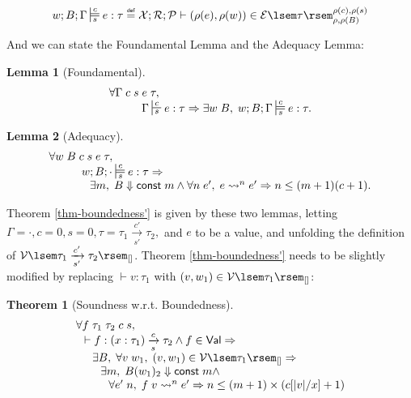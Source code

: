 \documentclass[preprint]{sigplanconf}
\newcommand{\typing}[4]{\sststile{#4}{#3}#1:#2}
\newcommand{\related}[4]{\sdtstile{#4}{#3}#1:#2}
\newcommand{\arrow}[4]{#1\xrightarrow[#3]{#2}#4}
\newcommand{\relV}[1]{\mathcal{V}\lsem#1\rsem}
\newcommand{\relE}[1]{\mathcal{E}\lsem#1\rsem}
\newcommand\defeq{\mathrel{\overset{\makebox[0pt]{\mbox{\normalfont\tiny\sffamily def}}}{=}}}
\newtheorem{thm}{Theorem}
\newtheorem{lem}{Lemma}
\begin{document}
$$
w;B;\Gamma\related{e}{\tau}{c}{s}\defeq\mathcal{X};\mathcal{R};\mathcal{P}\vdash(\rho(e),\rho(w))\in\relE{\tau}^{\rho(c),\rho(s)}_{\rho,\rho(B)}
$$

And we can state the Foundamental Lemma and the Adequacy Lemma:

\begin{lem}[\label{lem-foundamental}Foundamental]
$$
\begin{array}{l}
\forall \Gamma\;c\;s\;e\;\tau,\\
\hspace{.4in} \Gamma\typing{e}{\tau}{c}{s} \Rightarrow \exists w\;B,\; w;B;\Gamma\related{e}{\tau}{c}{s}.\\
\end{array}
$$
\end{lem}

\begin{lem}[\label{lem-adequacy}Adequacy]
$$
\begin{array}{l}
\forall w\;B\;c\;s\;e\;\tau,\\
\hspace{.4in} w;B;\cdot\related{e}{\tau}{c}{s} \Rightarrow \\
\hspace{.5in} \exists m,\; B\Downarrow \mathsf{const}\;m \wedge \forall n\;e',\;e\leadsto^ne'\Rightarrow n\leq(m+1)(c+1). \\
\end{array}
$$
\end{lem}

Theorem \ref{thm-boundedness'} is given by these two lemmas, letting $\Gamma=\cdot,c=0,s=0,\tau=\arrow{\tau_1}{c'}{s'}{\tau_2},$ and $e$ to be a value, and unfolding the definition of $\relV{\arrow{\tau_1}{c'}{s'}{\tau_2}}_{[]}$. Theorem \ref{thm-boundedness'} needs to be slightly modified by replacing $\vdash v:\tau_1$ with $(v,w_1)\in\relV{\tau_1}_{[]}$:

\begin{thm}[\label{thm-boundedness''}Soundness w.r.t. Boundedness]
$$
\begin{array}{l}
\forall f\;\tau_1\;\tau_2\;c\;s, \\
\hspace{0.1in} \vdash f:\arrow{(x:\tau_1)}{c}{s}{\tau_2} \wedge f\in\mathsf{Val}\Rightarrow \\
\hspace{0.2in} \exists B, \;\forall v\;w_1,\; (v,w_1)\in\relV{\tau_1}_{[]} \Rightarrow \\
\hspace{0.3in} \exists m,\; B(w_1)_2\Downarrow \mathsf{const}\;m \wedge \\
\hspace{0.4in} \forall e'\;n,\; f\;v\leadsto^n e' \Rightarrow n\leq (m+1)\times (c[|v|/x]+1)
\end{array}
$$
\end{thm}
\end{document}
